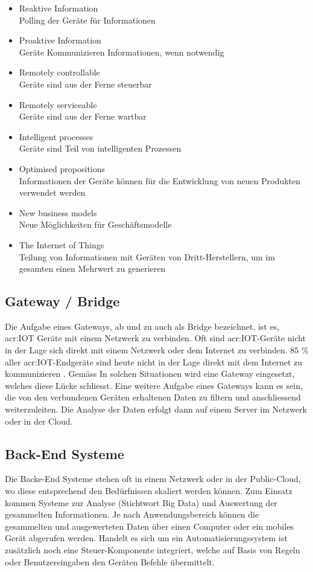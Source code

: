 \begin{itemize} 
\item Reaktive Information \\Polling der Geräte für Informationen
\item Proaktive Information \\Geräte Kommunizieren Informationen, wenn notwendig
\item Remotely controllable \\Geräte sind aus der Ferne steuerbar
\item Remotely serviceable \\Geräte sind aus der Ferne wartbar
\item Intelligent processes \\Geräte sind Teil von intelligenten Prozessen
\item Optimised propositions \\Informationen der Geräte können für die Entwicklung von neuen Produkten verwendet werden
\item New business models \\Neue Möglichkeiten für Geschäftsmodelle
\item The Internet of Things \\Teilung von Informationen mit Geräten von Dritt-Herstellern, um im gesamten einen Mehrwert zu generieren
\end{itemize}

\subsection{Gateway / Bridge}
Die Aufgabe eines Gateways, ab und zu auch als Bridge bezeichnet, ist es, \gls{acr:IOT} Geräte mit einem Netzwerk zu verbinden. Oft sind \gls{acr:IOT}-Geräte nicht in der Lage sich direkt mit einem Netzwerk oder dem Internet zu verbinden. 85 \% aller \gls{acr:IOT}-Endgeräte sind heute nicht in der Lage direkt mit dem Internet zu kommunizieren \cite[S. 2]{E:Intel:WhitePaper:DevelopingSolutionsIoT}. Gemäss In solchen Situationen wird eine Gateway eingesetzt, welches diese Lücke schliesst. Eine weitere Aufgabe eines Gateways kann es sein, die von den verbundenen Geräten erhaltenen Daten zu filtern und anschliessend weiterzuleiten. Die Analyse der Daten erfolgt dann auf einem Server im Netzwerk oder in der Cloud. 


\subsection{Back-End Systeme}
Die Backe-End Systeme stehen oft in einem Netzwerk oder in der Public-Cloud, wo diese entsprechend den Bedürfnissen skaliert werden können. Zum Einsatz kommen Systeme zur Analyse (Stichtwort Big Data) und Auswertung der gesammelten Informationen. Je nach Anwendungsbereich können die gesammelten und ausgewerteten Daten über einen Computer oder ein mobiles Gerät abgerufen werden. Handelt es sich um ein Automatisierungssystem ist zusätzlich noch eine Steuer-Komponente integriert, welche auf Basis von Regeln oder Benutzereingaben den Geräten Befehle übermittelt.


